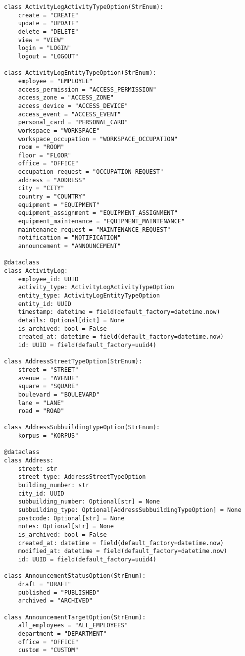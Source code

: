 \begin{lstlisting}[style=pythonstyle]
class ActivityLogActivityTypeOption(StrEnum):
    create = "CREATE"
    update = "UPDATE"
    delete = "DELETE"
    view = "VIEW"
    login = "LOGIN"
    logout = "LOGOUT"

class ActivityLogEntityTypeOption(StrEnum):
    employee = "EMPLOYEE"
    access_permission = "ACCESS_PERMISSION"
    access_zone = "ACCESS_ZONE"
    access_device = "ACCESS_DEVICE"
    access_event = "ACCESS_EVENT"
    personal_card = "PERSONAL_CARD"
    workspace = "WORKSPACE"
    workspace_occupation = "WORKSPACE_OCCUPATION"
    room = "ROOM"
    floor = "FLOOR"
    office = "OFFICE"
    occupation_request = "OCCUPATION_REQUEST"
    address = "ADDRESS"
    city = "CITY"
    country = "COUNTRY"
    equipment = "EQUIPMENT"
    equipment_assignment = "EQUIPMENT_ASSIGNMENT"
    equipment_maintenance = "EQUIPMENT_MAINTENANCE"
    maintenance_request = "MAINTENANCE_REQUEST"
    notification = "NOTIFICATION"
    announcement = "ANNOUNCEMENT"

@dataclass
class ActivityLog:
    employee_id: UUID
    activity_type: ActivityLogActivityTypeOption
    entity_type: ActivityLogEntityTypeOption
    entity_id: UUID
    timestamp: datetime = field(default_factory=datetime.now)
    details: Optional[dict] = None
    is_archived: bool = False
    created_at: datetime = field(default_factory=datetime.now)
    id: UUID = field(default_factory=uuid4)

class AddressStreetTypeOption(StrEnum):
    street = "STREET"
    avenue = "AVENUE"
    square = "SQUARE"
    boulevard = "BOULEVARD"
    lane = "LANE"
    road = "ROAD"

class AddressSubbuildingTypeOption(StrEnum):
    korpus = "KORPUS"

@dataclass
class Address:
    street: str
    street_type: AddressStreetTypeOption
    building_number: str
    city_id: UUID
    subbuilding_number: Optional[str] = None
    subbuilding_type: Optional[AddressSubbuildingTypeOption] = None
    postcode: Optional[str] = None
    notes: Optional[str] = None
    is_archived: bool = False
    created_at: datetime = field(default_factory=datetime.now)
    modified_at: datetime = field(default_factory=datetime.now)
    id: UUID = field(default_factory=uuid4)

class AnnouncementStatusOption(StrEnum):
    draft = "DRAFT"
    published = "PUBLISHED"
    archived = "ARCHIVED"

class AnnouncementTargetOption(StrEnum):
    all_employees = "ALL_EMPLOYEES"
    department = "DEPARTMENT"
    office = "OFFICE"
    custom = "CUSTOM"


\end{lstlisting}
